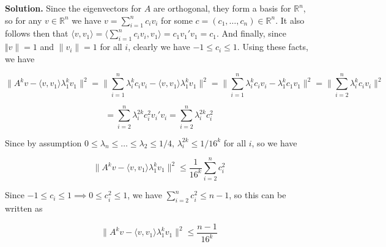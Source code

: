 \textbf{Solution.} Since the eigenvectors for \(A\) are orthogonal, they form a basis for \(\mathbb{R}^n\), so for any \(v \in \mathbb{R}^n\) we have \(v = \sum_{i=1}^n c_i v_i\) for some \(c = (c_1, \ldots, c_n) \in \mathbb{R}^n\). It also follows then that \(\langle v, v_1 \rangle = \langle   \sum_{i=1}^n c_i v_i, v_1 \rangle = c_1 v_1' v_1 = c_1\). And finally, since \(\Vert v \rVert = 1\) and \(\lVert v_i \rVert = 1\) for all \(i\), clearly we have \(-1 \leq c_i \leq 1\). Using these facts, we have 

\[
\lVert A^kv - \langle v, v_1 \rangle \lambda_1^k v_1 \rVert^2 = \lVert \sum_{i=1}^n \lambda_i^k c_i v_i - \langle v, v_1 \rangle \lambda_1^k v_1 \rVert^2  = \lVert \sum_{i=1}^n \lambda_i^k c_i v_i - \lambda_1^k c_1v_1 \rVert^2 = \lVert \sum_{i=2}^n \lambda_i^k c_i v_i  \rVert^2 
\]

\[
= \sum_{i=2}^n \lambda_i^{2k} c_i^2 v_i'v_i = \sum_{i=2}^n \lambda_i^{2k} c_i^2
\]

Since by assumption \(0 \leq \lambda_n \leq \ldots \leq \lambda_2 \leq 1/4\), \(\lambda_i^{2k} \leq 1/16^k\) for all \(i\), so we have

\[
\lVert A^kv - \langle v, v_1 \rangle \lambda_1^k v_1 \rVert^2  \leq  \frac{1}{16^k} \sum_{i=2}^n c_i^2
\]

Since \(-1 \leq c_i \leq 1 \implies 0 \leq c_i^2 \leq 1\), we have \(\sum_{i=2}^n c_i^2 \leq n- 1\), so this can be written as

\[
\boxed{
\lVert A^kv - \langle v, v_1 \rangle \lambda_1^k v_1 \rVert^2  \leq  \frac{n-1}{16^k} }
\]

